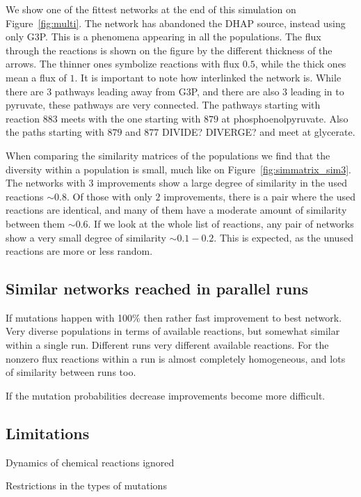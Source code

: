 \documentclass[a4paper,12pt]{article}
\begin{document}
We show one of the fittest networks at the end of this simulation on Figure~\ref{fig:multi}. The network has abandoned the DHAP source, instead using only G3P. This is a phenomena appearing in all the populations. The flux through the reactions is shown on the figure by the different thickness of the arrows. The thinner ones symbolize reactions with flux $0.5$, while the thick ones mean a flux of $1$. It is important to note how interlinked the network is.  While there are 3 pathways leading away from G3P, and there are also $3$ leading in to pyruvate, these pathways are very connected. The pathways starting with reaction $883$ meets with the one starting with $879$ at phosphoenolpyruvate. Also the paths starting with $879$ and $877$ DIVIDE? DIVERGE? and meet at glycerate. 

When comparing the similarity matrices of the populations we find that the diversity within a population is small, much like on Figure~\ref{fig:simmatrix_sim3}. The networks with $3$ improvements show a large degree of similarity in the used reactions $\sim 0.8$. Of those with only $2$ improvements, there is a pair where the used reactions are identical, and many of them have a moderate amount of similarity between them $\sim 0.6$. If we look at the whole list of reactions, any pair of networks show a very small degree of similarity $\sim 0.1-0.2$. This is expected, as the unused reactions are more or less random. 

\subsection{Similar networks reached in parallel runs}
\label{sub:similar_networks_reached_in_paralell_runs}
If mutations happen with 100$\%$ then rather fast improvement to best network. Very diverse populations in terms of available reactions, but somewhat similar within a single run. Different runs very different available reactions. For the nonzero flux reactions within a run is almost completely homogeneous, and lots of similarity between runs too. 

If the mutation probabilities decrease improvements become more difficult. 



\subsection{Limitations}
Dynamics of chemical reactions ignored

Restrictions in the types of mutations
\end{document}
